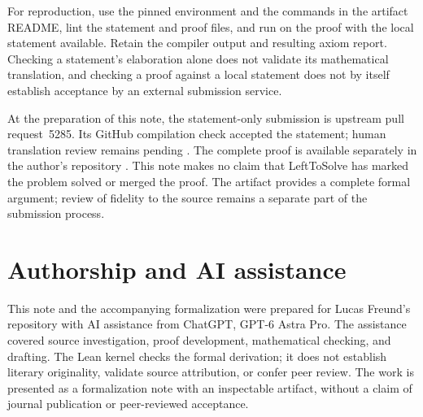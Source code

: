 \documentclass[11pt]{article}
\theoremstyle{remark}
\begin{document}
For reproduction, use the pinned environment and the commands in the
artifact README, lint the statement and proof files, and run
 on the proof with the local statement available.
Retain the compiler output and resulting axiom report. Checking a
statement's elaboration alone does not validate its mathematical
translation, and checking a proof against a local statement does not
by itself establish acceptance by an external submission service.

At the preparation of this note, the statement-only submission is
upstream pull request~5285. Its GitHub compilation check accepted the
statement; human translation review remains pending \cite{submission}.
The complete proof is available separately in the author's repository
\cite{artifact}. This note makes no claim that LeftToSolve has marked
the problem solved or merged the proof. The artifact provides a
complete formal argument; review of fidelity to the source remains a
separate part of the submission process.

\section*{Authorship and AI assistance}

This note and the accompanying formalization were prepared for Lucas
Freund's repository with AI assistance from ChatGPT, GPT-6 Astra Pro.
The assistance covered source investigation, proof development,
mathematical checking, and drafting. The Lean kernel checks the formal
derivation; it does not establish literary originality, validate
source attribution, or confer peer review. The work is presented as a
formalization note with an inspectable artifact, without a claim of
journal publication or peer-reviewed acceptance.
\end{document}

